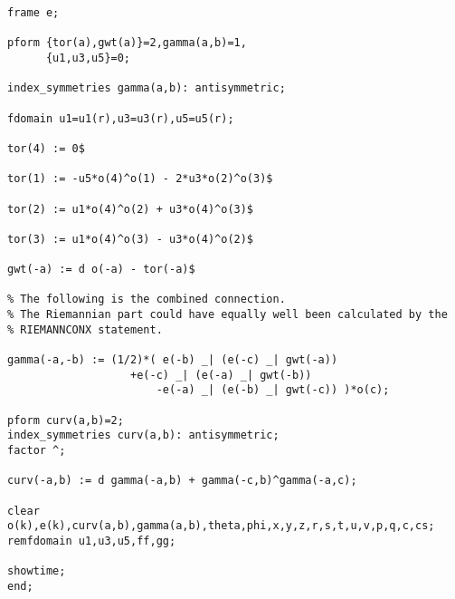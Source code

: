 {\begin{verbatim}
frame e;

pform {tor(a),gwt(a)}=2,gamma(a,b)=1,
      {u1,u3,u5}=0;

index_symmetries gamma(a,b): antisymmetric;

fdomain u1=u1(r),u3=u3(r),u5=u5(r);

tor(4) := 0$

tor(1) := -u5*o(4)^o(1) - 2*u3*o(2)^o(3)$

tor(2) := u1*o(4)^o(2) + u3*o(4)^o(3)$

tor(3) := u1*o(4)^o(3) - u3*o(4)^o(2)$

gwt(-a) := d o(-a) - tor(-a)$

% The following is the combined connection.
% The Riemannian part could have equally well been calculated by the
% RIEMANNCONX statement.

gamma(-a,-b) := (1/2)*( e(-b) _| (e(-c) _| gwt(-a))
	               +e(-c) _| (e(-a) _| gwt(-b))
                       -e(-a) _| (e(-b) _| gwt(-c)) )*o(c);

pform curv(a,b)=2;
index_symmetries curv(a,b): antisymmetric;
factor ^;

curv(-a,b) := d gamma(-a,b) + gamma(-c,b)^gamma(-a,c);

clear o(k),e(k),curv(a,b),gamma(a,b),theta,phi,x,y,z,r,s,t,u,v,p,q,c,cs;
remfdomain u1,u3,u5,ff,gg;

showtime;
end;

\end{verbatim}
}
